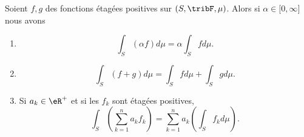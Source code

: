 \begin{theorem}        \label{ThoooCZCXooVvNcFD}
    Soient \( f,g\) des fonctions étagées positives sur \( (S,\tribF,\mu)\). Alors si \( \alpha\in\mathopen[ 0 , \infty \mathclose]\) nous avons
    \begin{enumerate}
        \item
            \begin{equation}
                \int_S(\alpha f)d\mu=\alpha\int_Sfd\mu.
            \end{equation}
        \item
            \begin{equation}
                \int_S(f+g)d\mu=\int_Sfd\mu+\int_Sgd\mu.
            \end{equation}
        \item\label{ITEMooOJRAooQkoQyD}
    Si \( a_k\in \eR^+\) et si les \( f_k\) sont étagées positives,
    \begin{equation}
        \int_S\left( \sum_{k=1}^na_kf_k \right)=\sum_{k=1}^na_k\left( \int_S f_kd\mu \right).
    \end{equation}
    \end{enumerate}
\end{theorem}

